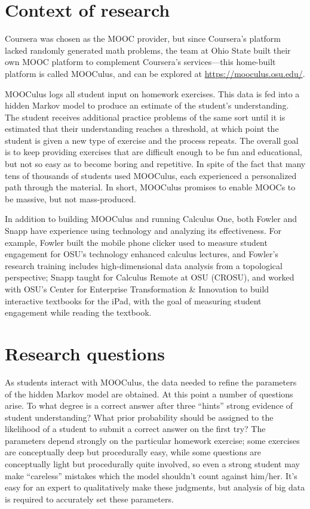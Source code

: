 \documentclass[12pt]{article}
\begin{document}
\section{Context of research}

Coursera was chosen as the MOOC provider, but since Coursera's
platform lacked randomly generated math problems, the team at Ohio
State built their own MOOC platform to complement Coursera's
services---this home-built platform is called MOOCulus, and can be
explored at \url{https://mooculus.osu.edu/}.

MOOCulus logs all student input on homework exercises. This data is
fed into a hidden Markov model to produce an estimate of the student's
understanding. The student receives additional practice problems of
the same sort until it is estimated that their understanding reaches a
threshold, at which point the student is given a new type of exercise
and the process repeats.  The overall goal is to keep providing
exercises that are difficult enough to be fun and educational, but not
so easy as to become boring and repetitive.  In spite of the fact that
many tens of thousands of students used MOOCulus, each experienced a
personalized path through the material.  In short, MOOCulus promises
to enable MOOCs to be massive, but not mass-produced.

In addition to building MOOCulus and running Calculus One, both Fowler
and Snapp have experience using technology and analyzing its
effectiveness.  For example, Fowler built the mobile phone clicker
used to measure student engagement for OSU's technology enhanced
calculus lectures, and Fowler's research training includes
high-dimensional data analysis from a topological perspective; Snapp
taught for Calculus Remote at OSU (CROSU), and worked with OSU's
Center for Enterprise Transformation \& Innovation to build
interactive textbooks for the iPad, with the goal of measuring student
engagement while reading the textbook.

\section{Research questions}

As students interact with MOOCulus, the data needed to refine the
parameters of the hidden Markov model are obtained.  At this point a
number of questions arise. To what degree is a correct answer after
three ``hints'' strong evidence of student understanding?  What prior
probability should be assigned to the likelihood of a student to
submit a correct answer on the first try?  The parameters depend
strongly on the particular homework exercise; some exercises are
conceptually deep but procedurally easy, while some questions are
conceptually light but procedurally quite involved, so even a strong
student may make ``careless'' mistakes which the model shouldn't count
against him/her.  It's easy for an expert to qualitatively make these
judgments, but analysis of big data is required to accurately set
these parameters.
\end{document}
